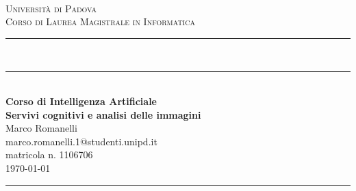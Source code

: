 \documentclass[fleqn,a4paper,11pt]{article}
\newcommand\HRule{\rule{\textwidth}{1pt}}
\newcommand\DRule{\rule{\textwidth}{.4pt}\\[\dimexpr-\baselineskip+1mm+2pt] \rule{\textwidth}{2pt}}
\begin{document}
\begin{titlepage}
\begin{center}
	\begin{minipage}{6in}
  		\centering
  		\hspace*{1.6in}
	\end{minipage}\\[1cm]
\textsc{\LARGE Universit\`a di Padova}\\[.2cm]
\textsc{\large Corso di Laurea Magistrale in Informatica}\\[.3cm]
\DRule \\[.5cm]
{\Large \bfseries Corso di Intelligenza Artificiale} \\[.4cm]
{\huge \bfseries Servivi cognitivi e analisi delle immagini} \\[.4cm]
{\Large Marco Romanelli} \\[.2cm]
{\footnotesize marco.romanelli.1@studenti.unipd.it} \\
{\footnotesize matricola n. 1106706} \\[1cm]
{\large \today}
\HRule \\[3cm]
\end{center}
\end{titlepage}
\newpage


 

 

 















%
\end{document}
